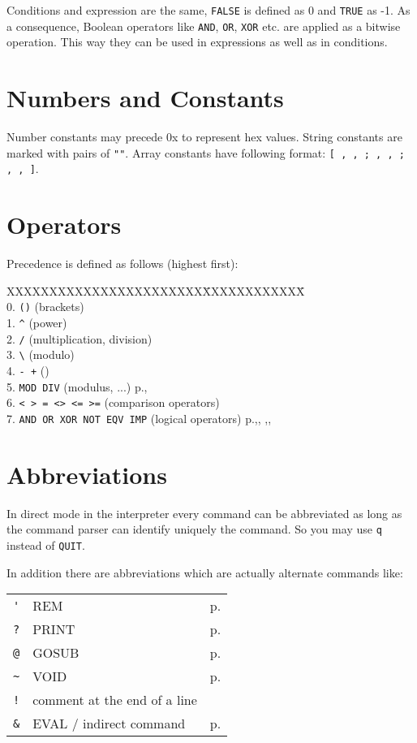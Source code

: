 Conditions and expression are the same, \verb|FALSE| is defined as 0 and
\verb|TRUE| as -1. As a consequence, Boolean operators like \verb|AND|, 
\verb|OR|, \verb|XOR| etc. are applied as a bitwise operation. This way they can
be used in expressions as well as in conditions.

\section{Numbers and Constants}

Number constants may precede 0x to represent hex values. String constants are
marked with pairs of \verb|""|. Array constants have following format: 
\verb|[ , , ; , , ; , , ]|.


\section{Operators}
Precedence is defined as follows (highest first):
\begin{tabbing}
XXXXXXXXXXXXXXXXXXXXXXX\=XXXXXXXXXXXX\=\kill\\
0. {\tt ()}      \>(brackets)\\
1. {\tt \verb|^|}      \>(power) \\
2. {\tt * /}     \>(multiplication, division) \\
3. \verb|\| \> (modulo) \\
4. \verb|- +|           \>    ()\\
5. \verb|MOD DIV|        \>    (modulus, ...)\> p.\pageref{MOD},\pageref{DIV}\\
6. \verb|< > = <> <= >=|  \>    (comparison operators)\\
7. \verb|AND OR XOR NOT EQV IMP| \>(logical operators)\> p.\pageref{AND},\pageref{OR},
\pageref{NOT},\pageref{EQV},\pageref{IMP}\\
 \end{tabbing}

\section{Abbreviations}

In direct mode in the interpreter every command can be abbreviated as long as 
the command parser can identify uniquely the command. So you may use 
{\tt q} instead of {\tt QUIT}.

In addition there are abbreviations which are actually alternate commands like:

\begin{center}
\begin{tabular}{|lll|}\hline
\verb|'| &  REM & p.\pageref{REMbABBREVpbh}\\
\verb|?| &     PRINT& p.\pageref{PRINT}\\
\verb|@| &     GOSUB& p.\pageref{GOSUBbABBREVpba}\\
\verb|~| &     VOID& p.\pageref{VOIDbABBREVpbt}\\
\verb|!| &  comment at the end of a line & \\
\verb|&| &     EVAL / indirect command& p.\pageref{EVAL}\\
\hline
\end{tabular}
\end{center}

